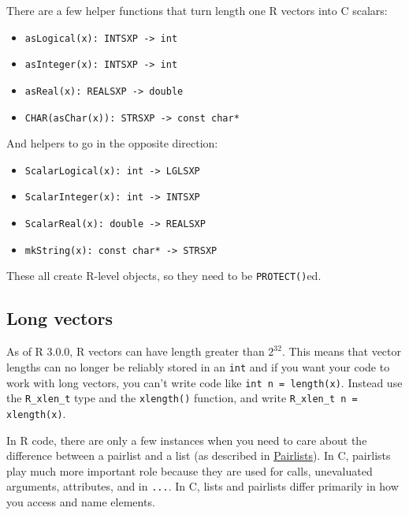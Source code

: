 There are a few helper functions that turn length one R vectors into C
scalars:

\begin{itemize}
\itemsep1pt\parskip0pt
\item
  \texttt{asLogical(x): INTSXP -\textgreater{} int}
\item
  \texttt{asInteger(x): INTSXP -\textgreater{} int}
\item
  \texttt{asReal(x): REALSXP -\textgreater{} double}
\item
  \texttt{CHAR(asChar(x)): STRSXP -\textgreater{} const char*}
\end{itemize}

And helpers to go in the opposite direction:

\begin{itemize}
\itemsep1pt\parskip0pt
\item
  \texttt{ScalarLogical(x): int -\textgreater{} LGLSXP}
\item
  \texttt{ScalarInteger(x): int -\textgreater{} INTSXP}
\item
  \texttt{ScalarReal(x): double -\textgreater{} REALSXP}
\item
  \texttt{mkString(x): const char* -\textgreater{} STRSXP}
\end{itemize}

These all create R-level objects, so they need to be
\texttt{PROTECT()}ed.

\subsection{Long vectors}

As of R 3.0.0, R vectors can have length greater than $2 ^ 32$. This
means that vector lengths can no longer be reliably stored in an
\texttt{int} and if you want your code to work with long vectors, you
can't write code like \texttt{int n = length(x)}. Instead use the
\texttt{R\_xlen\_t} type and the \texttt{xlength()} function, and write
\texttt{R\_xlen\_t n = xlength(x)}. 


In R code, there are only a few instances when you need to care about
the difference between a pairlist and a list (as described in
\hyperref[pairlists]{Pairlists}). In C, pairlists play much more
important role because they are used for calls, unevaluated arguments,
attributes, and in \texttt{...}. In C, lists and pairlists differ
primarily in how you access and name elements. 

